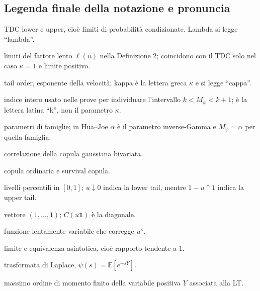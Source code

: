 \documentclass[11pt,a4paper]{article}
\newcommand{\one}{\boldsymbol{1}}
\begin{document}
\subsection*{Legenda finale della notazione e pronuncia}
\begin{description}[leftmargin=3.5cm,style=nextline]
  \item[$\lambda_L,\lambda_U$ in Schmidt] TDC lower e upper, cioè limiti di
  probabilità condizionate. Lambda si legge ``lambda''.
  \item[$\lambda_L(C),\lambda_U(C)$ in Hua--Joe] limiti del fattore lento
  $\ell(u)$ nella Definizione 2; coincidono con il TDC solo nel caso
  $\kappa=1$ e limite positivo.
  \item[$\kappa_L,\kappa_U$] tail order, esponente della velocità; kappa è la
  lettera greca $\kappa$ e si legge ``cappa''.
  \item[$k$] indice intero usato nelle prove per individuare l'intervallo
  $k<M_\psi<k+1$; è la lettera latina ``k'', non il parametro $\kappa$.
  \item[$\theta,\alpha$] parametri di famiglie; in Hua--Joe $\alpha$ è il
  parametro inverse-Gamma e $M_\psi=\alpha$ per quella famiglia.
  \item[$\rho$] correlazione della copula gaussiana bivariata.
  \item[$C,\overline C$] copula ordinaria e survival copula.
  \item[$u,v$] livelli percentili in $[0,1]$; $u\downarrow0$ indica la lower
  tail, mentre $1-u\uparrow1$ indica la upper tail.
  \item[$\one$] vettore $(1,\ldots,1)$; $C(u\one)$ è la diagonale.
  \item[$\ell(u)$] funzione lentamente variabile che corregge $u^\kappa$.
  \item[$\lim$, $\sim$] limite e equivalenza asintotica, cioè rapporto tendente
  a $1$.
  \item[LT] trasformata di Laplace, $\psi(s)=\mathbb E[e^{-sY}]$.
  \item[$M_\psi$] massimo ordine di momento finito della variabile positiva
  $Y$ associata alla LT.
\end{description}
\end{document}
